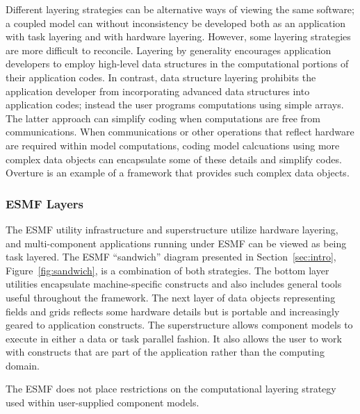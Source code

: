 Different layering strategies can be alternative ways of viewing the same
software; a coupled model can without inconsistency 
be developed both as an application with task layering and with hardware 
layering.  However, some layering strategies are more difficult to reconcile. 
Layering by generality encourages application developers to employ high-level 
data structures in the computational portions of their application codes.  In 
contrast, data structure layering prohibits the application developer from 
incorporating advanced data structures into application codes; instead the
user programs computations using simple arrays.  The latter approach can 
simplify coding
when computations are free from communications.  When communications or other
operations that reflect hardware are required within model computations, coding
model calcuations using more complex data objects can encapsulate some of 
these details and simplify codes.  Overture \cite{overture} is an example of a framework 
that provides such complex data objects. 

\subsubsection{ESMF Layers}

The ESMF utility infrastructure and superstructure utilize hardware layering, 
and multi-component applications running under ESMF can be viewed as 
being task layered.  The ESMF ``sandwich'' diagram presented in 
Section~\ref{sec:intro}, Figure~\ref{fig:sandwich}, is a combination 
of both strategies.  The bottom layer utilities encapsulate 
machine-specific constructs and also includes general tools useful throughout
the framework.  The next layer of data objects representing
fields and grids reflects some hardware details but is portable and increasingly
geared to application constructs.  The 
superstructure allows component models to execute in either a data or task 
parallel fashion.  It also allows the user to work with constructs that are part
of the application rather than the computing domain.  

The ESMF does not place restrictions on the computational layering 
strategy used within user-supplied component models.  








